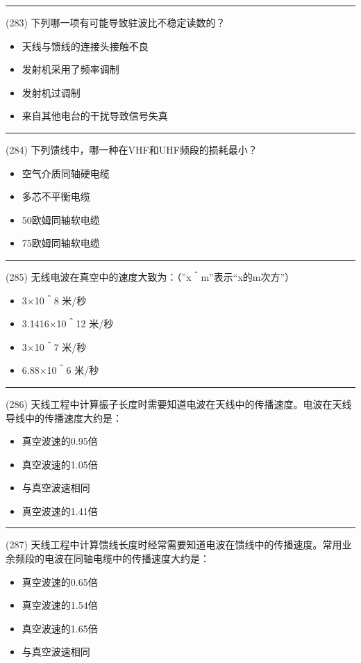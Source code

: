 \documentclass[twocolumn]{ctexart}  %
\begin{document}
\noindent\rule{0.5\textwidth}{1pt}
\heiti (283) 下列哪一项有可能导致驻波比不稳定读数的？ \songti {\color{gray} [LK1223] }
\begin{itemize}
	\item  天线与馈线的连接头接触不良
	\item  发射机采用了频率调制
	\item  发射机过调制
	\item  来自其他电台的干扰导致信号失真
\end{itemize}


\noindent\rule{0.5\textwidth}{1pt}
\heiti (284) 下列馈线中，哪一种在VHF和UHF频段的损耗最小？ \songti {\color{gray} [LK1224] }
\begin{itemize}
	\item  空气介质同轴硬电缆
	\item  多芯不平衡电缆
	\item  50欧姆同轴软电缆
	\item  75欧姆同轴软电缆
\end{itemize}


\noindent\rule{0.5\textwidth}{1pt}
\heiti (285) 无线电波在真空中的速度大致为：（”x＾m”表示“x的m次方”） \songti {\color{gray} [LK0972] }
\begin{itemize}
	\item  3×10＾8 米/秒
	\item  3.1416×10＾12 米/秒
	\item  3×10＾7 米/秒
	\item  6.88×10＾6 米/秒
\end{itemize}


\noindent\rule{0.5\textwidth}{1pt}
\heiti (286) 天线工程中计算振子长度时需要知道电波在天线中的传播速度。电波在天线导线中的传播速度大约是： \songti {\color{gray} [LK0973] }
\begin{itemize}
	\item  真空波速的0.95倍
	\item  真空波速的1.05倍
	\item  与真空波速相同
	\item  真空波速的1.41倍
\end{itemize}


\noindent\rule{0.5\textwidth}{1pt}
\heiti (287) 天线工程中计算馈线长度时经常需要知道电波在馈线中的传播速度。常用业余频段的电波在同轴电缆中的传播速度大约是： \songti {\color{gray} [LK0974] }
\begin{itemize}
	\item  真空波速的0.65倍
	\item  真空波速的1.54倍
	\item  真空波速的1.65倍
	\item  与真空波速相同
\end{itemize}
\end{document}
